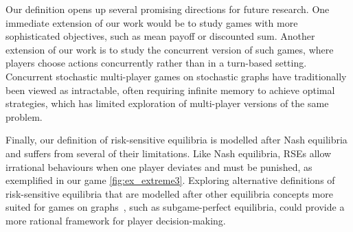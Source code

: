 Our definition opens up several promising directions for future research.
One immediate extension of our work would be to study games with more sophisticated objectives, such as mean payoff or discounted sum. 
Another extension of our work is to study the concurrent version of such games, where players choose actions concurrently rather than in a turn-based setting. Concurrent stochastic multi-player games on stochastic graphs have traditionally been viewed as intractable, often requiring infinite memory to achieve optimal strategies, which has limited exploration of multi-player versions of the same problem. 

Finally, our definition of risk-sensitive equilibria is modelled after Nash equilibria and suffers from several of their limitations.
Like Nash equilibria, RSEs allow irrational behaviours when one player deviates and must be punished, %
as exemplified in our game \cref{fig:ex_extreme3}.
Exploring alternative definitions of risk-sensitive equilibria that are modelled after other equilibria concepts more suited for games on graphs~\cite[Section~7.1]{Osb04}, such as subgame-perfect equilibria, could provide a more rational framework for player decision-making.



